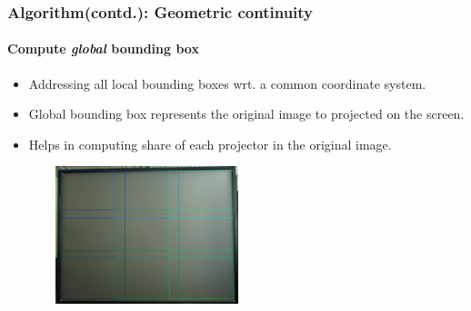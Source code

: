 \documentclass{beamer}
\begin{document}
\begin{frame}
\frametitle{Algorithm(contd.): Geometric continuity}
\framesubtitle{Compute \textit{global} bounding box}
\begin{itemize}
\item Addressing all local bounding boxes wrt. a common coordinate system. 
\item Global bounding box represents the original image to projected on the screen.
\item Helps in computing share of each projector in the original image.
\end{itemize}

\begin{figure}
\includegraphics[width=6cm,height=4cm]{figures/mod_all_bboxes.jpg}
\end{figure}
\end{frame}

\end{document}

